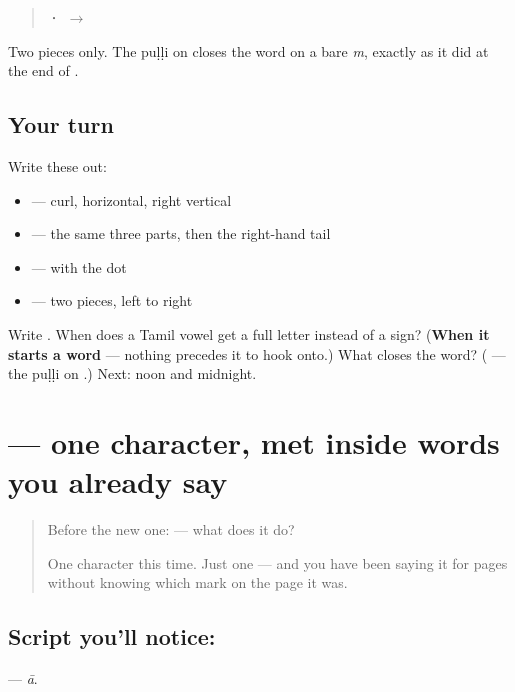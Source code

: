 \begin{quote}
\textbf{ ·  $\to$ }
\end{quote}

Two pieces only. The puḷḷi on \textbf{} closes the word on a bare \emph{m}, exactly as it did at the end of \textbf{}.

\subsection*{Your turn}
Write these out:

\begin{itemize}
\raggedright
  \item \textbf{} — curl, horizontal, right vertical
  \item \textbf{} — the same three parts, then the right-hand tail
  \item \textbf{} —  with the dot
  \item \textbf{} — two pieces, left to right
\end{itemize}

\begin{tcolorbox}[breakable,colback=teal!4,colframe=teal!35!black,title={Before you move on}]
Write \textbf{}. When does a Tamil vowel get a full letter instead of a sign? (\textbf{When it starts a word} — nothing precedes it to hook onto.) What closes the word? (\textbf{} — the puḷḷi on .) Next: noon and midnight.
\end{tcolorbox}
\section[\texorpdfstring{\ta{ஆ} (ā)}{ஆ (ā)}]{ — one character, met inside words you already say}

\label{lesson:TA-S120-letter-aa}



\begin{quote}
Before the new one:  — what does it do?

One character this time. Just one — and you have been saying it for pages without knowing which mark on the page it was.
\end{quote}

\subsection*{Script you'll notice: }
\textbf{} — \emph{ā}.

